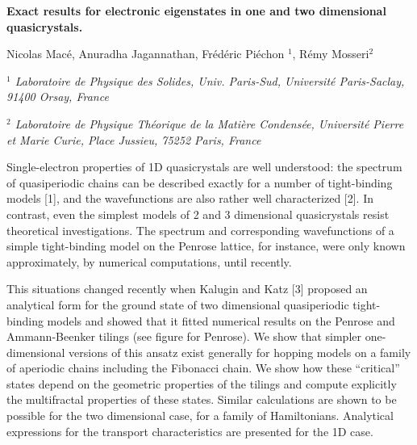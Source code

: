 \documentclass[a4paper,10pt]{article}
\begin{document}
\begin{center}
{\Large \bf Exact results for electronic eigenstates in one and two dimensional quasicrystals.}
\vspace{1cm}

Nicolas Macé, Anuradha Jagannathan, Frédéric Piéchon $^1$, Rémy Mosseri$^2$

\vspace{0.5cm}
{\it $^1$ Laboratoire de Physique des Solides, Univ. Paris-Sud, Université Paris-Saclay, 91400 Orsay, France}

{\it $^2$ Laboratoire de Physique Théorique de la Matière Condensée, Université Pierre et Marie Curie, Place Jussieu, 75252 Paris, France}

\end{center}

\vspace{0cm}


Single-electron properties of 1D quasicrystals are well understood: the spectrum of quasiperiodic chains can be described exactly for a number of tight-binding models [1], and the wavefunctions are also rather well characterized [2].
In contrast, even the simplest models of 2 and 3 dimensional quasicrystals resist theoretical investigations.
The spectrum and corresponding wavefunctions of a simple tight-binding model on the Penrose lattice, for instance, were only known approximately, by numerical computations, until recently.

This situations changed recently when Kalugin and Katz [3] proposed an analytical form for the ground state of two dimensional quasiperiodic tight-binding models and showed that it fitted numerical results on the Penrose and Ammann-Beenker tilings (see figure for Penrose).
We show that simpler one-dimensional versions of this ansatz exist generally for hopping models on a family of aperiodic chains including the Fibonacci chain.
We show how these ``critical'' states depend on the geometric properties of the tilings and compute explicitly the multifractal properties of these states. 
Similar calculations are shown to be possible for the two dimensional case, for a family of Hamiltonians.
Analytical expressions for the transport characteristics are presented for the 1D case. 


\end{document}
